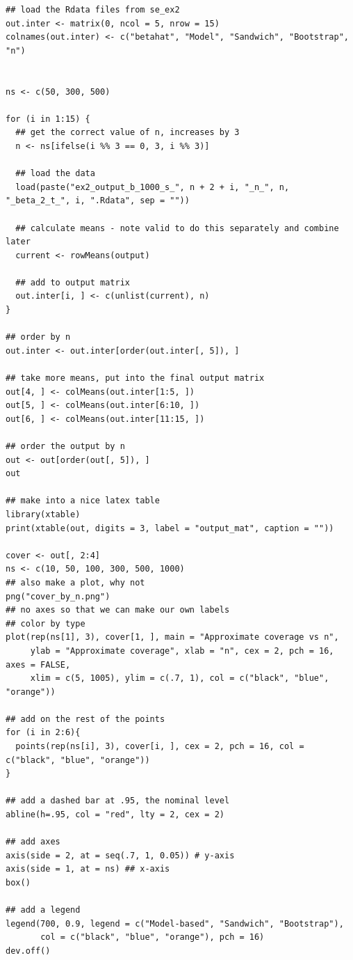 \documentclass{article}
\begin{document}
\begin{enumerate}
{\begin{verbatim}
## load the Rdata files from se_ex2
out.inter <- matrix(0, ncol = 5, nrow = 15)
colnames(out.inter) <- c("betahat", "Model", "Sandwich", "Bootstrap", "n")


ns <- c(50, 300, 500)

for (i in 1:15) {
  ## get the correct value of n, increases by 3
  n <- ns[ifelse(i %% 3 == 0, 3, i %% 3)]
  
  ## load the data
  load(paste("ex2_output_b_1000_s_", n + 2 + i, "_n_", n, "_beta_2_t_", i, ".Rdata", sep = ""))
  
  ## calculate means - note valid to do this separately and combine later
  current <- rowMeans(output)
  
  ## add to output matrix
  out.inter[i, ] <- c(unlist(current), n) 
}

## order by n
out.inter <- out.inter[order(out.inter[, 5]), ]

## take more means, put into the final output matrix
out[4, ] <- colMeans(out.inter[1:5, ])
out[5, ] <- colMeans(out.inter[6:10, ])
out[6, ] <- colMeans(out.inter[11:15, ])

## order the output by n
out <- out[order(out[, 5]), ]
out

## make into a nice latex table
library(xtable)
print(xtable(out, digits = 3, label = "output_mat", caption = ""))

cover <- out[, 2:4]
ns <- c(10, 50, 100, 300, 500, 1000)
## also make a plot, why not
png("cover_by_n.png")
## no axes so that we can make our own labels
## color by type
plot(rep(ns[1], 3), cover[1, ], main = "Approximate coverage vs n", 
     ylab = "Approximate coverage", xlab = "n", cex = 2, pch = 16, axes = FALSE,
     xlim = c(5, 1005), ylim = c(.7, 1), col = c("black", "blue", "orange"))

## add on the rest of the points
for (i in 2:6){
  points(rep(ns[i], 3), cover[i, ], cex = 2, pch = 16, col = c("black", "blue", "orange"))
}

## add a dashed bar at .95, the nominal level
abline(h=.95, col = "red", lty = 2, cex = 2)

## add axes
axis(side = 2, at = seq(.7, 1, 0.05)) # y-axis
axis(side = 1, at = ns) ## x-axis
box()

## add a legend
legend(700, 0.9, legend = c("Model-based", "Sandwich", "Bootstrap"), 
       col = c("black", "blue", "orange"), pch = 16)
dev.off()
\end{verbatim}
}
\end{enumerate}
\end{document}
